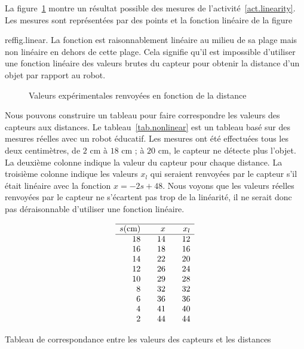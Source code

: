 La figure~\ref{fig.nonlinear} montre un résultat possible des mesures de l'activité~\ref{act.linearity}. Les mesures sont représentées par des points et la fonction linéaire de la figure~{ref{fig.linear}. La fonction est raisonnablement linéaire au milieu de sa plage mais non linéaire en dehors de cette plage. Cela signifie qu'il est impossible d'utiliser une fonction linéaire des valeurs brutes du capteur pour obtenir la distance d'un objet par rapport au robot.

\begin{figure}
\begin{center}
\caption{Valeurs expérimentales renvoyées en fonction de la distance}\label{fig.nonlinear}
\end{center}
\end{figure}

Nous pouvons construire un tableau pour faire correspondre les valeurs des capteurs aux distances. Le tableau~\ref{tab.nonlinear} est un tableau basé sur des mesures réelles avec un robot éducatif. Les mesures ont été effectuées tous les deux centimètres, de $2$ cm à $18$ cm ; à $20$ cm, le capteur ne détecte plus l'objet. La deuxième colonne indique la valeur du capteur pour chaque distance. La troisième colonne indique les valeurs $x_l$ qui seraient renvoyées par le capteur s'il était linéaire avec la fonction $x=-2s+48$. Nous voyons que les valeurs réelles renvoyées par le capteur ne s'écartent pas trop de la linéarité, il ne serait donc pas déraisonnable d'utiliser une fonction linéaire.

\begin{table}
\begin{displaymath}
\begin{array}{r@{\hspace{2em}}r@{\hspace{2em}}r}\hline
s \textrm{(cm)} & x & x_l\\\hline
18 &14 & 12\\
16 &18 & 16\\
 14&22 & 20\\
 12&26 & 24\\
 10&29 & 28\\
 8 &32 & 32\\
 6 &36 & 36\\
 4 &41 & 40\\
 2 &44 & 44\\
\end{array}
\end{displaymath}
\caption{Tableau de correspondance entre les valeurs des capteurs et les distances}\label{tab.nonlinear}
\end{table}


}
